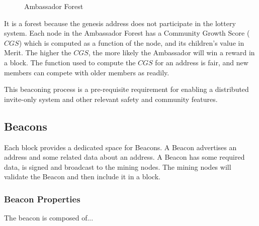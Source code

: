 \documentclass{article}
\begin{document}
\begin{figure}[H]
    \begin{center}
    \end{center}
    \caption{Ambassador Forest}

\end{figure}

It is a forest because the \gls{genesis address} does not participate in the lottery
system.  Each node in the Ambassador Forest has a Community Growth Score ($CGS$)
which is computed as a function of the node, and its children's value in Merit.
The higher the $CGS$, the more likely the Ambassador will win a reward in a block.
The function used to compute the $CGS$ for an address is fair, and new members
can compete with older members as readily.

This beaconing process is a pre-requisite requirement for enabling a
distributed invite-only system and other relevant safety and community features.

\subsection{Beacons}

Each block provides a dedicated space for Beacons.  A Beacon advertises an address
and some related data about an address.  A Beacon has some required data,
is signed and broadcast to the mining nodes.  The mining nodes will validate
the Beacon and then include it in a block.

\subsubsection{Beacon Properties}
The beacon is composed of...
\end{document}
